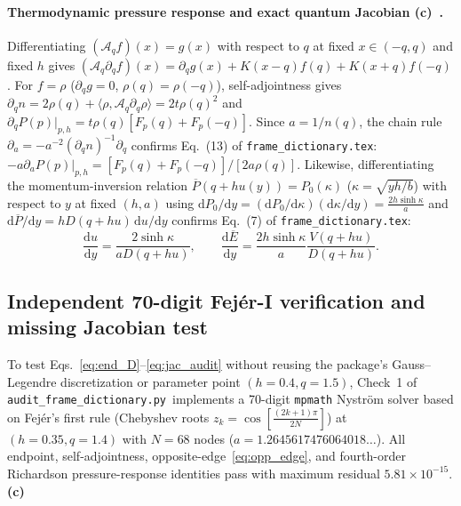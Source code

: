 \documentclass[11pt,a4paper]{article}
\newcommand{\Lc}{\textsf{\textbf{(c)}}\ }
\newcommand{\scr}{\texttt{audit\_\allowbreak frame\_\allowbreak dictionary.py}}
\newcommand{\dd}{\mathrm d}
\begin{document}
\paragraph{Thermodynamic pressure response and exact quantum Jacobian \Lc.}
Differentiating $(\mathcal A_q f)(x)=g(x)$ with respect to $q$ at fixed $x\in(-q,q)$ and
fixed $h$ gives $(\mathcal A_q\partial_q f)(x)=\partial_q g(x)+K(x-q)f(q)+K(x+q)f(-q)$.
For $f=\rho$ ($\partial_q g=0$, $\rho(q)=\rho(-q)$), self-adjointness gives
$\partial_q n=2\rho(q)+\langle\rho,\mathcal A_q\partial_q\rho\rangle=2t\rho(q)^2$ and
$\partial_q P(p)|_{p,h}=t\rho(q)[F_p(q)+F_p(-q)]$. Since $a=1/n(q)$, the chain rule
$\partial_a=-a^{-2}(\partial_q n)^{-1}\partial_q$ confirms Eq.~(13) of
\texttt{frame\_\allowbreak dictionary.tex}:
$-a\partial_a P(p)|_{p,h}=[F_p(q)+F_p(-q)]/[2a\rho(q)]$.
Likewise, differentiating the momentum-inversion relation
$\overline P(q+hu(y))=P_0(\kappa)$ ($\kappa=\sqrt{yh/b}$) with respect to $y$ at
fixed $(h,a)$ using $\dd P_0/\dd y=(\dd P_0/\dd\kappa)(\dd\kappa/\dd y)=\frac{2h\sinh\kappa}{a}$
and $\dd\overline P/\dd y=hD(q+hu)\,\dd u/\dd y$ confirms Eq.~(7) of
\texttt{frame\_\allowbreak dictionary.tex}:
\begin{equation}\label{eq:jac_audit}
 \frac{\dd u}{\dd y}=\frac{2\sinh\kappa}{aD(q+hu)},\qquad
 \frac{\dd\overline E}{\dd y}=\frac{2h\sinh\kappa}{a}\frac{V(q+hu)}{D(q+hu)}.
\end{equation}

\subsection{Independent 70-digit Fej\'er-I verification and missing Jacobian test}
To test Eqs.~\eqref{eq:end_D}--\eqref{eq:jac_audit} without reusing the package's
Gauss--Legendre discretization or parameter point $(h=0.4,q=1.5)$, Check~1 of
\scr\ implements a 70-digit \texttt{mpmath} Nystr\"om solver based on Fej\'er's
first rule (Chebyshev roots $z_k=\cos[\frac{(2k+1)\pi}{2N}]$) at $(h=0.35,q=1.4)$
with $N=68$ nodes ($a=1.2645617476064018\dots$). All endpoint, self-adjointness,
opposite-edge~\eqref{eq:opp_edge}, and fourth-order Richardson pressure-response
identities pass with maximum residual $5.81\times 10^{-15}$. \Lc
\end{document}
